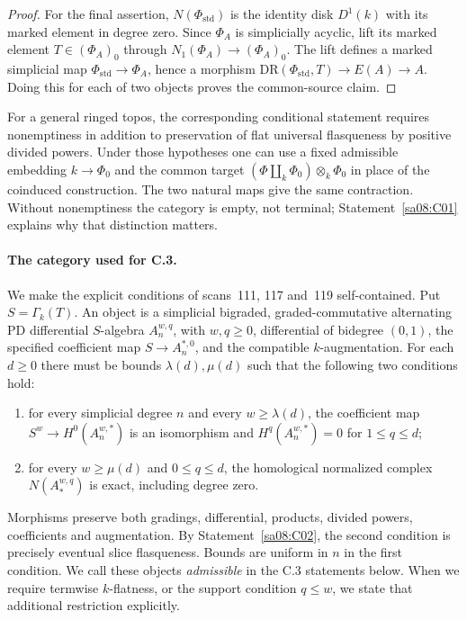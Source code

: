 \begin{proof}
For the final assertion, $N(\Phi_{\mathrm{std}})$ is the identity
disk $D^1(k)$ with its marked element in degree zero. Since
$\Phi_A$ is simplicially acyclic, lift its marked element
$T\in(\Phi_A)_0$ through $N_1(\Phi_A)\to(\Phi_A)_0$.
The lift defines a marked simplicial map
$\Phi_{\mathrm{std}}\to\Phi_A$, hence a morphism
$\mathrm{DR}(\Phi_{\mathrm{std}},T)\to E(A)\to A$.
Doing this for each of two objects proves the common-source claim.
\end{proof}

For a general ringed topos, the corresponding conditional statement
requires nonemptiness in addition to preservation of flat universal
flasqueness by positive divided powers. Under those hypotheses one
can use a fixed admissible embedding $k\to\Phi_0$ and the common
target $(\Phi\amalg_k\Phi_0)\otimes_k\Phi_0$ in place of the
coinduced construction. The two natural maps give the same
contraction. Without nonemptiness the category is empty, not
terminal; Statement~\ref{sa08:C01} explains why that distinction
matters.

\paragraph{The category used for C.3.}
We make the explicit conditions of scans~111, 117 and~119
self-contained. Put $S=\Gamma_k(T)$. An object is a simplicial
bigraded, graded-commutative alternating PD differential
$S$-algebra $A_n^{w,q}$, with $w,q\geq0$, differential of
bidegree $(0,1)$, the specified coefficient map
$S\to A_n^{*,0}$, and the compatible $k$-augmentation.
For each $d\geq0$ there must be bounds $\lambda(d),\mu(d)$
such that the following two conditions hold:
\begin{enumerate}
\item for every simplicial degree $n$ and every $w\geq\lambda(d)$,
the coefficient map $S^w\to H^0(A_n^{w,*})$ is an isomorphism
and $H^q(A_n^{w,*})=0$ for $1\leq q\leq d$;
\item for every $w\geq\mu(d)$ and $0\leq q\leq d$, the
homological normalized complex $N(A_*^{w,q})$ is exact,
including degree zero.
\end{enumerate}
Morphisms preserve both gradings, differential, products,
divided powers, coefficients and augmentation. By
Statement~\ref{sa08:C02}, the second condition is precisely
eventual slice flasqueness. Bounds are uniform in $n$ in the
first condition. We call these objects \emph{admissible} in
the C.3 statements below. When we require termwise $k$-flatness,
or the support condition $q\leq w$, we state that additional
restriction explicitly.

